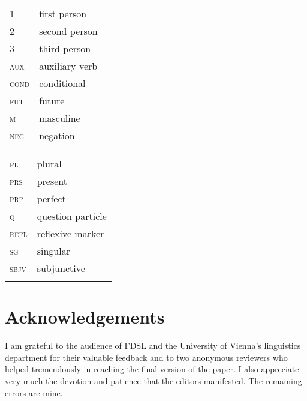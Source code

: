 \documentclass[output=paper]{langscibook}
\begin{document}
\begin{tabularx}{.5\textwidth}{@{}lX}
\textsc{1}&first person\\
\textsc{2}&second person\\
\textsc{3}&third person\\
\textsc{aux}&auxiliary verb\\
\textsc{cond}&conditional\\
\textsc{fut}&future\\
\textsc{m}&masculine\\
\textsc{neg}&negation\\
\end{tabularx}\begin{tabularx}{.5\textwidth}{lX@{}}
\textsc{pl}&plural\\
\textsc{prs}&present\\
\textsc{prf}&perfect\\
\textsc{q}&question particle\\
\textsc{refl}&reflexive marker\\
\textsc{sg}&singular\\
\textsc{sbjv}&subjunctive\\
&\\
\end{tabularx}

\section*{Acknowledgements}

I am grateful to the audience of FDSL and the University of Vienna's linguistics department for their valuable feedback and to two anonymous reviewers who helped tremendously in reaching the final version of the paper. I also appreciate very much the devotion and patience that the editors manifested. The remaining errors are mine.

{\sloppy\printbibliography[heading=subbibliography,notkeyword=this]}
\end{document}
